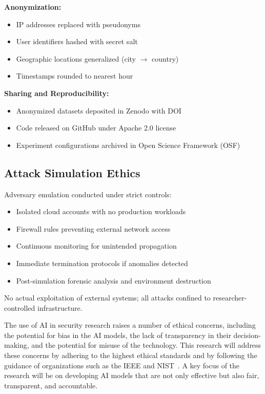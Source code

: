 \textbf{Anonymization:}
\begin{itemize}
    \item IP addresses replaced with pseudonyms
    \item User identifiers hashed with secret salt
    \item Geographic locations generalized (city $\rightarrow$ country)
    \item Timestamps rounded to nearest hour
\end{itemize}

\textbf{Sharing and Reproducibility:}
\begin{itemize}
    \item Anonymized datasets deposited in Zenodo with DOI
    \item Code released on GitHub under Apache 2.0 license
    \item Experiment configurations archived in Open Science Framework (OSF)
\end{itemize}

\subsection{Attack Simulation Ethics}
Adversary emulation conducted under strict controls:
\begin{itemize}
    \item Isolated cloud accounts with no production workloads
    \item Firewall rules preventing external network access
    \item Continuous monitoring for unintended propagation
    \item Immediate termination protocols if anomalies detected
    \item Post-simulation forensic analysis and environment destruction
\end{itemize}

No actual exploitation of external systems; all attacks confined to researcher-controlled infrastructure.

The use of AI in security research raises a number of ethical concerns, including the potential for bias in the AI models, the lack of transparency in their decision-making, and the potential for misuse of the technology. This research will address these concerns by adhering to the highest ethical standards and by following the guidance of organizations such as the IEEE and NIST~\cite{webasha2024ethics}. A key focus of the research will be on developing AI models that are not only effective but also fair, transparent, and accountable.

